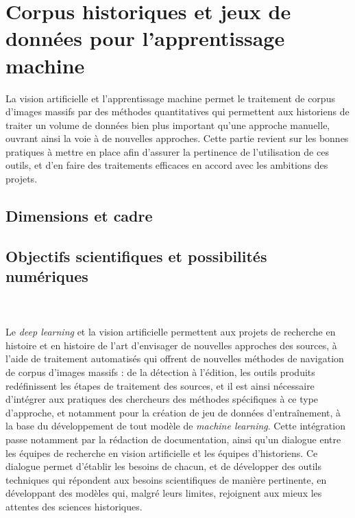 \documentclass[a4paper,12pt,twoside]{book}
\newcommand{\ml}{\textit{machine learning}\xspace}
\newcommand{\dl}{\textit{deep learning}\xspace}
\newcommand{\clearemptydoublepage}{\newpage{\pagestyle{empty}\cleardoublepage}}
\begin{document}
        \chapter[Corpus historiques et jeux de données]{Corpus historiques et jeux de données pour l’apprentissage machine}
        
        La vision artificielle et l'apprentissage machine permet le traitement de corpus d'images massifs par des méthodes quantitatives qui permettent aux historiens de traiter un volume de données bien plus important qu'une approche manuelle, ouvrant ainsi la voie à de nouvelles approches. Cette partie revient sur les bonnes pratiques à mettre en place afin d'assurer la pertinence de l'utilisation de ces outils, et d'en faire des traitements efficaces en accord avec les ambitions des projets.
        
                \section{Dimensions et cadre}
                    
            
                \section{Objectifs scientifiques et possibilités numériques}
                    
        \\
        \\
        Le \dl et la vision artificielle permettent aux projets de recherche en histoire et en histoire de l'art d'envisager de nouvelles approches des sources, à l'aide de traitement automatisés qui offrent de nouvelles méthodes de navigation de corpus d'images massifs : de la détection à l'édition, les outils produits redéfinissent les étapes de traitement des sources, et il est ainsi nécessaire d'intégrer aux pratiques des chercheurs des méthodes spécifiques à ce type d'approche, et notamment pour la création de jeu de données d'entraînement, à la base du développement de tout modèle de \ml. Cette intégration passe notamment par la rédaction de documentation, ainsi qu'un dialogue entre les équipes de recherche en vision artificielle et les équipes d'historiens. Ce dialogue permet d'établir les besoins de chacun, et de développer des outils techniques qui répondent aux besoins scientifiques de manière pertinente, en développant des modèles qui, malgré leurs limites, rejoignent aux mieux les attentes des sciences historiques.
        \clearemptydoublepage
\end{document}
